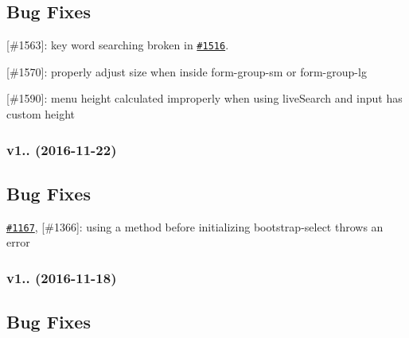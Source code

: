 \subsection*{Bug Fixes}


\begin{DoxyItemize}
\item \mbox{[}\#1563\mbox{]}\+: key word searching broken in \href{https://github.com/silviomoreto/bootstrap-select/issues/1516}{\tt \#1516}.
\item \mbox{[}\#1570\mbox{]}\+: properly adjust size when inside form-\/group-\/sm or form-\/group-\/lg
\item \mbox{[}\#1590\mbox{]}\+: menu height calculated improperly when using live\+Search and input has custom height
\end{DoxyItemize}





\subsubsection*{v1.. (2016-\/11-\/22)}

\subsection*{Bug Fixes}


\begin{DoxyItemize}
\item \href{https://github.com/silviomoreto/bootstrap-select/issues/1167}{\tt \#1167}, \mbox{[}\#1366\mbox{]}\+: using a method before initializing bootstrap-\/select throws an error
\end{DoxyItemize}





\subsubsection*{v1.. (2016-\/11-\/18)}

\subsection*{Bug Fixes}


